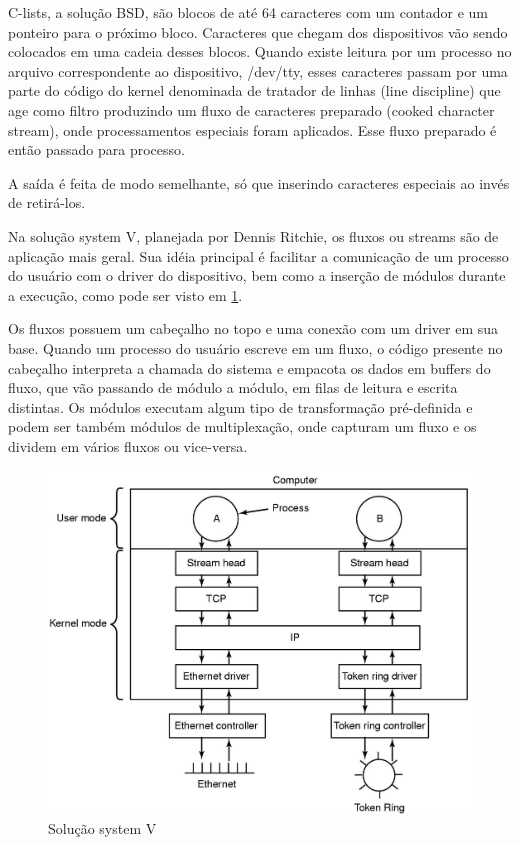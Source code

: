 C-lists, a solução BSD, são blocos de até 64 caracteres com um contador e um ponteiro para o próximo bloco. Caracteres que chegam dos dispositivos vão sendo colocados em uma cadeia desses blocos. Quando existe leitura por um processo no arquivo correspondente ao dispositivo, /dev/tty, esses caracteres passam por uma parte do código do kernel denominada de tratador de linhas (line discipline) que age como filtro produzindo um fluxo de caracteres preparado (cooked character stream), onde processamentos especiais foram aplicados. Esse fluxo preparado é então passado para processo.

A saída é feita de modo semelhante, só que inserindo caracteres especiais ao invés de retirá-los.

Na solução system V, planejada por Dennis Ritchie, os fluxos ou streams são de aplicação mais geral. Sua idéia principal é facilitar a comunicação de um processo do usuário com o driver do dispositivo, bem como a inserção de módulos durante a execução, como pode ser visto em \ref{fig:system_V}.

Os fluxos possuem um cabeçalho no topo e uma conexão com um driver em sua base. Quando um processo do usuário escreve em um fluxo, o código presente no cabeçalho interpreta a chamada do sistema e empacota os dados em buffers do fluxo, que vão passando de módulo a módulo, em filas de leitura e escrita distintas. Os módulos executam algum tipo de transformação pré-definida e podem ser também módulos de multiplexação, onde capturam um fluxo e os dividem em vários fluxos ou vice-versa.

\begin{figure}
	\caption{Solução system V}
	\label{fig:system_V}
	\includegraphics{imgs/systemVstreams.png}
\end{figure}

